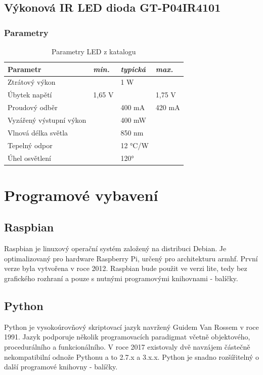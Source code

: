 \subsection*{Výkonová IR LED dioda GT-P04IR4101}
\subsubsection{Parametry}
\begin{table}[h]
\centering
\caption{Parametry LED z katalogu}
\label{Parametry LEDl}
\begin{tabular}{|l|l|l|l|}
\hline
\textbf{Parametr}        & \textit{min.} & \textit{typická} & \textit{max.} \\ \hline
Ztrátový výkon &              & 1 W           &              \\ \hline
Úbytek napětí            & 1,65 V        &              & 1,75 V        \\ \hline
Proudový odběr            &              & 400 mA        & 420 mA             \\ \hline
Vyzářený výstupní výkon      &              & 400 mW        &              \\ \hline
Vlnová délka světla         &              & 850 nm        &              \\ \hline
Tepelný odpor         &              & 12 °C/W       &              \\ \hline
Úhel osvětlení              &              & 120°         &              \\ \hline
\end{tabular}
\end{table}

\clearpage


\section{Programové vybavení}

\subsection*{Raspbian}
Raspbian je linuxový operační systém založený na distribuci Debian. Je optimalizovaný pro hardware Raspberry Pi, určený pro architekturu armhf. První verze byla vytvořena v roce 2012. Raspbian bude použit ve verzi lite, tedy bez grafického rozhraní a pouze s nutnými programovými knihovnami - balíčky.

\subsection*{Python}
Python je vysokoúrovňový skriptovací jazyk navržený Guidem Van Rossem v roce 1991.
Jazyk podporuje několik programovacích paradigmat včetně objektového, procedurálního a funkcionálního. V roce 2017 existovaly dvě navzájem částečně nekompatibilní odnože Pythonu a to 2.7.x a 3.x.x. Python je snadno rozšířitelný o další programové knihovny - balíčky.

